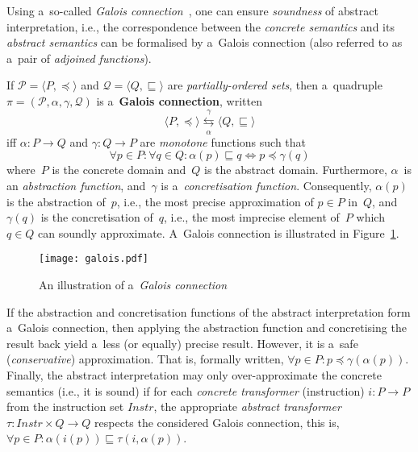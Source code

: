 Using a~so-called \emph{Galois connection}~\cite{AILatticeModelCousot, wideningNarrowingCousot, savAI, staticAnalysisMoller, programAnalysisNielson, staticAnalysisRival}, one can ensure \emph{soundness} of abstract interpretation, i.e., the correspondence between the \emph{concrete semantics} and its \emph{abstract semantics} can be formalised by a~Galois connection (also referred to as a~pair of \emph{adjoined functions}).
\begin{definition}
    If $ \mathcal{P} = \langle P, \preceq \rangle $ and $ \mathcal{Q} = \langle Q, \sqsubseteq \rangle $ are \emph{partially-ordered sets}, then a~quadruple $ \pi = (\mathcal{P}, \alpha, \gamma, \mathcal{Q}) $ is a~\textbf{Galois connection}, written
    $$
        \langle P, \preceq \rangle \overset{\gamma}{\underset{\alpha}\leftrightarrows} \langle Q, \sqsubseteq \rangle
    $$
    iff $ \alpha : P \rightarrow Q $ and $ \gamma : Q \rightarrow P $ are \emph{monotone} functions such that
    $$
        \forall p \in P : \forall q \in Q : \alpha(p) \sqsubseteq q \Longleftrightarrow p \preceq \gamma(q)
    $$
    where~$ P $ is the concrete domain and~$ Q $ is the abstract domain. Furthermore, $ \alpha $~is an \emph{abstraction function}, and~$ \gamma $ is a~\emph{concretisation function}. Consequently, $ \alpha(p) $ is the abstraction of~$ p $, i.e., the most precise approximation of $ p \in P $ in~$ Q $, and $ \gamma(q) $ is the concretisation of~$ q $, i.e., the most imprecise element of~$ P $ which $ q \in Q $ can soundly approximate. A~Galois connection is illustrated in Figure~\ref{fig:galois}.
\end{definition}

\begin{figure}[hbt]
    \centering
    \texttt{[image: galois.pdf]}
    \caption{An illustration of a~\emph{Galois connection}}
    \label{fig:galois}
\end{figure}

If the abstraction and concretisation functions of the abstract interpretation form a~Galois connection, then applying the abstraction function and concretising the result back yield a~less (or equally) precise result. However, it is a~safe (\emph{conservative}) approximation. That is, formally written, $ \forall p \in P : p \preceq \gamma(\alpha(p)) $. Finally, the abstract interpretation may only over-approximate the concrete semantics (i.e., it is sound) if for each \emph{concrete transformer} (instruction) $ i : P \rightarrow P $ from the instruction set $ Instr $, the appropriate \emph{abstract transformer} $ \tau : Instr \times Q \rightarrow Q $ respects the considered Galois connection, this is, $ \forall p \in P : \alpha(i(p)) \sqsubseteq \tau(i, \alpha(p)) $.

